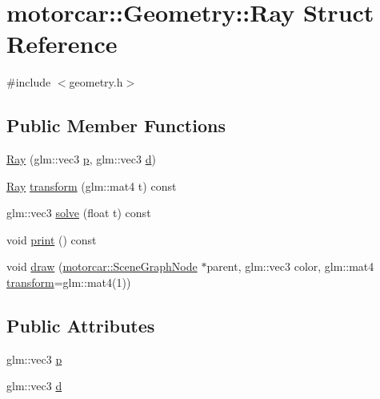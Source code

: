 \hypertarget{structmotorcar_1_1Geometry_1_1Ray}{\section{motorcar\-:\-:Geometry\-:\-:Ray Struct Reference}
\label{structmotorcar_1_1Geometry_1_1Ray}
}


{\ttfamily \#include $<$geometry.\-h$>$}

\subsection*{Public Member Functions}
\begin{DoxyCompactItemize}
\item 
\hyperlink{structmotorcar_1_1Geometry_1_1Ray_a0e703633f6101262ee14d17831745ca4}{Ray} (glm\-::vec3 \hyperlink{structmotorcar_1_1Geometry_1_1Ray_ac58960f9f82f19c6f514ae6c948deb86}{p}, glm\-::vec3 \hyperlink{structmotorcar_1_1Geometry_1_1Ray_a7140db28237277781ecb792fc280a95d}{d})
\item 
\hyperlink{structmotorcar_1_1Geometry_1_1Ray}{Ray} \hyperlink{structmotorcar_1_1Geometry_1_1Ray_a7de7ddd9609a26bdd1f2fe74933dfff6}{transform} (glm\-::mat4 t) const 
\item 
glm\-::vec3 \hyperlink{structmotorcar_1_1Geometry_1_1Ray_af14d102bfe9fdf08bb3396ad33d928bd}{solve} (float t) const 
\item 
void \hyperlink{structmotorcar_1_1Geometry_1_1Ray_a058da6e22e8fdcd7e2aa301153c9fa16}{print} () const 
\item 
void \hyperlink{structmotorcar_1_1Geometry_1_1Ray_a7d9403aa28c33c40d4b7e3c64ce3776d}{draw} (\hyperlink{classmotorcar_1_1SceneGraphNode}{motorcar\-::\-Scene\-Graph\-Node} $\ast$parent, glm\-::vec3 color, glm\-::mat4 \hyperlink{structmotorcar_1_1Geometry_1_1Ray_a7de7ddd9609a26bdd1f2fe74933dfff6}{transform}=glm\-::mat4(1))
\end{DoxyCompactItemize}
\subsection*{Public Attributes}
\begin{DoxyCompactItemize}
\item 
glm\-::vec3 \hyperlink{structmotorcar_1_1Geometry_1_1Ray_ac58960f9f82f19c6f514ae6c948deb86}{p}
\item 
glm\-::vec3 \hyperlink{structmotorcar_1_1Geometry_1_1Ray_a7140db28237277781ecb792fc280a95d}{d}
\end{DoxyCompactItemize}


